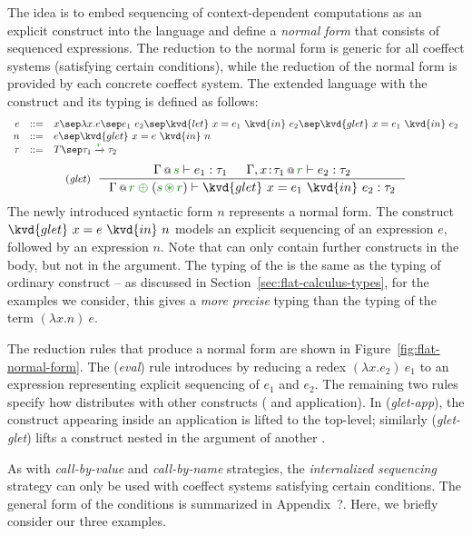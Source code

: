 The idea is to embed sequencing of context-dependent computations as an explicit construct into
the language and define a \emph{normal form} that consists of sequenced expressions. The reduction
to the normal form is generic for all coeffect systems (satisfying certain conditions), while the
reduction of the normal form is provided by each concrete coeffect system. The extended language
with the  construct and its typing is defined as follows:
%
\begin{equation*}
\begin{array}{rcl}
e &::=& x \sep \lambda x.e \sep e_1~e_2 \sep \kvd{let}~x = e_1~\kvd{in}~e_2 \sep \kvd{glet}~x = e_1~\kvd{in}~e_2\\
n &::=& e \sep \kvd{glet}~x=e~\kvd{in}~n\\
\tau &::=& T \sep \tau_1 \xrightarrow{\cclrd{r}} \tau_2
\end{array}
\end{equation*}
\begin{equation*}
\tyrule{glet}
  { \coctx{\Gamma}{\cclrd{s}} \vdash e_1 : \tau_1 &
    \coctx{\Gamma, x\!:\!\tau_1}{\cclrd{r}} \vdash e_2 : \tau_2 }
  { \coctx{\Gamma}{\cclrd{r}\;\cpar\;({\cclrd{s}\,\cseq\,\cclrd{r})}} \vdash \kvd{glet}~x=e_1~\kvd{in}~e_2 : \tau_2 }
\end{equation*}
%
The newly introduced syntactic form $n$ represents a normal form. The construct $\kvd{glet}~x=e~\kvd{in}~n$
models an explicit sequencing of an expression $e$, followed by an expression $n$. Note that  can 
only contain further  constructs in the body, but not in the argument. The typing of the 
is the same as the typing of ordinary  construct -- as discussed in Section~\ref{sec:flat-calculus-types},
for the examples we consider, this gives a \emph{more precise} typing than the typing of the
term $(\lambda x.n)~e$.

The reduction rules that produce a normal form are shown in Figure~\ref{fig:flat-normal-form}. The
(\emph{eval}) rule introduces  by reducing a redex $(\lambda x.e_2)~e_1$ to an expression
representing explicit sequencing of $e_1$ and $e_2$. The remaining two rules specify how 
distributes with other constructs ( and application). In (\emph{glet-app}), the 
construct appearing inside an application is lifted to the top-level; similarly (\emph{glet-glet}) 
lifts a  construct nested in the argument of another .

As with \emph{call-by-value} and \emph{call-by-name} strategies, the \emph{internalized sequencing}
strategy can only be used with coeffect systems satisfying certain conditions. The general form of
the conditions is summarized in Appendix~?. Here, we briefly consider our three examples.

